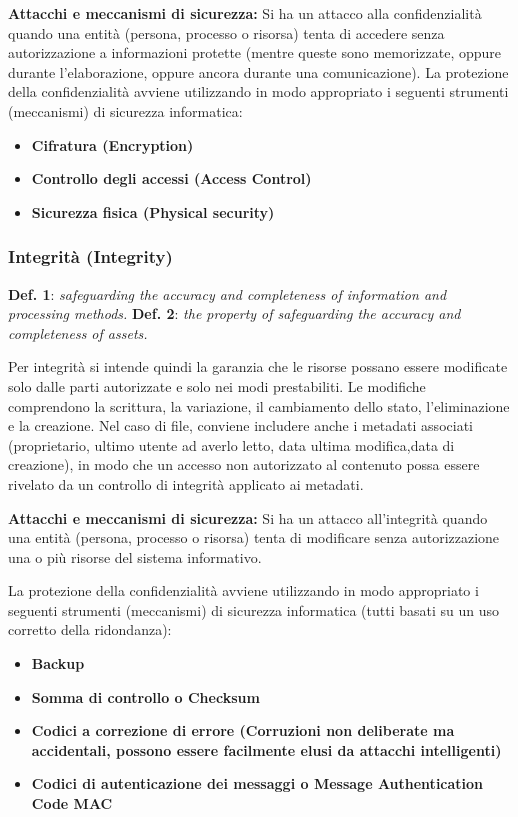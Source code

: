 \textbf{Attacchi e meccanismi di sicurezza:} Si ha un attacco alla confidenzialità quando una entità (persona, processo o risorsa) tenta di accedere senza autorizzazione a informazioni protette (mentre queste sono memorizzate, oppure durante l’elaborazione, oppure ancora durante una comunicazione). La protezione della confidenzialità avviene utilizzando in modo appropriato i seguenti strumenti (meccanismi) di sicurezza informatica:
\begin{itemize} 
  \item \textbf{Cifratura (Encryption)}
  \item \textbf{Controllo degli accessi (Access Control)}
  \item \textbf{Sicurezza fisica (Physical security)}
\end{itemize}

\subsubsection{Integrità (Integrity)}
\textbf{Def. 1}: \textit{safeguarding the accuracy and completeness of information and processing methods.}\newline
\textbf{Def. 2}: \textit{the property of safeguarding the accuracy and completeness of assets.}\newline


Per integrità si intende quindi la garanzia che le risorse possano essere modificate solo dalle parti autorizzate e solo nei modi prestabiliti. Le modifiche comprendono la scrittura, la variazione, il cambiamento dello stato, l’eliminazione e la creazione. Nel caso di file, conviene includere anche i metadati associati (proprietario, ultimo utente ad averlo letto, data ultima modifica,data di creazione), in modo che un accesso non autorizzato al contenuto possa essere rivelato da un controllo di integrità applicato ai metadati.\newline

\textbf{Attacchi e meccanismi di sicurezza:} Si ha un attacco all'integrità quando una entità (persona, processo o risorsa) tenta di modificare senza autorizzazione una o più risorse del sistema informativo.

 La protezione della confidenzialità avviene utilizzando in modo appropriato i seguenti strumenti (meccanismi) di sicurezza informatica (tutti basati su un uso corretto della ridondanza):
\begin{itemize} 
  \item \textbf{Backup}
  \item \textbf{Somma di controllo o Checksum}
  \item \textbf{Codici a correzione di errore (Corruzioni non deliberate ma accidentali, possono essere facilmente elusi da attacchi intelligenti)}
  \item \textbf{Codici di autenticazione dei messaggi o Message Authentication Code MAC} 
\end{itemize}


